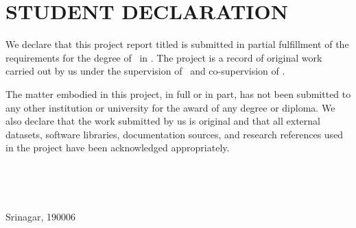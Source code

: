 \chapter*{STUDENT DECLARATION}

We declare that this project report titled \textbf{\projecttitle} is submitted in partial fulfillment of the requirements for the degree of \degree\ in \program. The project is a record of original work carried out by us under the supervision of \supervisor\ and co-supervision of \cosupervisor.

The matter embodied in this project, in full or in part, has not been submitted to any other institution or university for the award of any degree or diploma. We also declare that the work submitted by us is original and that all external datasets, software libraries, documentation sources, and research references used in the project have been acknowledged appropriately.

\vspace{2.0cm}
\noindent
\begin{minipage}[t]{0.45\textwidth}
\textbf{\studentone}\\
\enrollmentone
\end{minipage}
\hfill
\begin{minipage}[t]{0.45\textwidth}
\textbf{\studenttwo}\\
\enrollmenttwo
\end{minipage}

\vspace{1.0cm}
\noindent Srinagar, 190006\\
\submissionmonth
